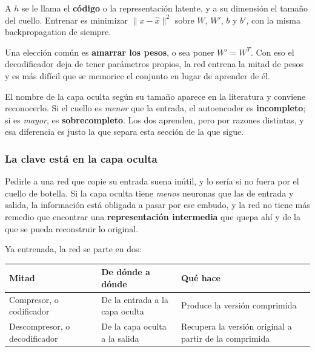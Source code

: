 \documentclass[11pt,letterpaper]{article}
\begin{document}
A $h$ se le llama el \textbf{código} o la representación latente, y a
su dimensión el tamaño del cuello. Entrenar es minimizar
$\lVert x - \hat{x} \rVert^2$ sobre $W$, $W'$, $b$ y $b'$, con la
misma backpropagation de siempre.

Una elección común es \textbf{amarrar los pesos}, o sea poner
$W' = W^{T}$. Con eso el decodificador deja de tener parámetros
propios, la red entrena la mitad de pesos y es más difícil que se
memorice el conjunto en lugar de aprender de él.

\begin{ojo}
  El nombre de la capa oculta según su tamaño aparece en la
  literatura y conviene reconocerlo. Si el cuello es \emph{menor} que
  la entrada, el autoencoder es \textbf{incompleto}; si es
  \emph{mayor}, es \textbf{sobrecompleto}. Los dos aprenden, pero por
  razones distintas, y esa diferencia es justo la que separa esta
  sección de la que sigue.
\end{ojo}

\subsubsection*{La clave está en la capa oculta}

Pedirle a una red que copie su entrada suena inútil, y lo sería si no
fuera por el cuello de botella. Si la capa oculta tiene \emph{menos}
neuronas que las de entrada y salida, la información está obligada a
pasar por ese embudo, y la red no tiene más remedio que encontrar una
\textbf{representación intermedia} que quepa ahí y de la que se pueda
reconstruir lo original.

Ya entrenada, la red se parte en dos:

\begin{center}
\begin{tabular}{>{\raggedright\arraybackslash}p{3.0cm}
                >{\raggedright\arraybackslash}p{4.2cm}
                >{\raggedright\arraybackslash}p{6.0cm}}
  \toprule
  \textbf{Mitad} & \textbf{De dónde a dónde} & \textbf{Qué hace} \\
  \midrule
  Compresor, o codificador &
  De la entrada a la capa oculta &
  Produce la versión comprimida \\
  \addlinespace
  Descompresor, o decodificador &
  De la capa oculta a la salida &
  Recupera la versión original a partir de la comprimida \\
  \bottomrule
\end{tabular}
\end{center}
\end{document}
